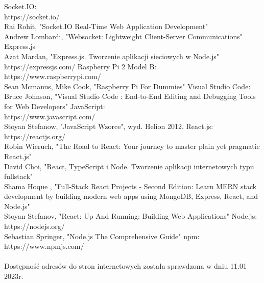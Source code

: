 \begin{thebibliography}{1}
 Socket.IO:
\\
https://socket.io/
\\
Rai Rohit, "Socket.IO Real-Time Web Application Development"
\\
Andrew Lombardi, "Websocket: Lightweight Client-Server Communications"
 Express.js
\\
Azat Mardan, "Express.js. Tworzenie aplikacji sieciowych w Node.js"
\\
https://expressjs.com/
Raspberry Pi 2 Model B:
\\
https://www.raspberrypi.com/
\\
 Sean Mcmanus, Mike Cook, "Raspberry Pi For Dummies"
Visual Studio Code:
\\
Bruce Johnson, "Visual Studio Code : End-to-End Editing and Debugging Tools for Web Developers"
 JavaScript:
\\
https://www.javascript.com/
\\
Stoyan Stefanow, "JavaScript Wzorce", wyd. Helion 2012.
React.js:
\\
https://reactjs.org/
\\
Robin Wieruch, "The Road to React: Your journey to master plain yet pragmatic React.js"
\\
David Choi, "React, TypeScript i Node. Tworzenie aplikacji internetowych typu fullstack"
\\
Shama Hoque , "Full-Stack React Projects - Second Edition: Learn MERN stack development by building modern web apps using MongoDB, Express, React, and Node.js"
\\
Stoyan Stefanov, "React: Up And Running: Building Web Applications"
Node.js:
\\
https://nodejs.org/
\\
Sebastian Springer, "Node.js The Comprehensive Guide"
 npm:
\\
https://www.npmjs.com/
\\
\\
Dostępność adresów do stron internetowych została sprawdzona w dniu 11.01 2023r.

\end{thebibliography}



